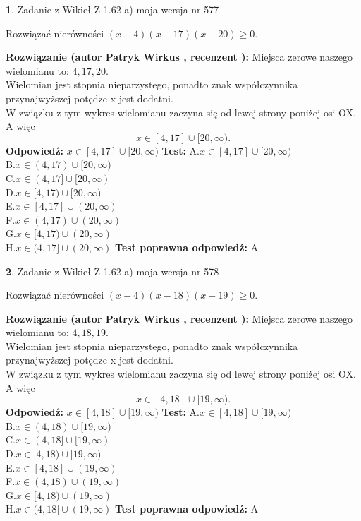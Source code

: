 \documentclass[12pt, a4paper]{article}
\theoremstyle{definition} %
\newtheorem{zad}{}
\newcommand{\zadStart}[1]{\begin{zad}#1\newline}
\newcommand{\zadStop}{\end{zad}}
\newcommand{\rozwStart}[2]{\noindent \textbf{Rozwiązanie (autor #1 , recenzent #2): }\newline}
\newcommand{\rozwStop}{\newline}
\newcommand{\odpStart}{\noindent \textbf{Odpowiedź:}\newline}
\newcommand{\odpStop}{\newline}
\newcommand{\testStart}{\noindent \textbf{Test:}\newline}
\newcommand{\testStop}{\newline}
\newcommand{\kluczStart}{\noindent \textbf{Test poprawna odpowiedź:}\newline}
\newcommand{\kluczStop}{\newline}
\begin{document}
\zadStart{Zadanie z Wikieł Z 1.62 a) moja wersja nr 577}

Rozwiązać nierówności $(x-4)(x-17)(x-20)\ge0$.
\zadStop
\rozwStart{Patryk Wirkus}{}
Miejsca zerowe naszego wielomianu to: $4, 17, 20$.\\
Wielomian jest stopnia nieparzystego, ponadto znak współczynnika przy\linebreak najwyższej potędze x jest dodatni.\\ W związku z tym wykres wielomianu zaczyna się od lewej strony poniżej osi OX. A więc $$x \in [4,17] \cup [20,\infty).$$
\rozwStop
\odpStart
$x \in [4,17] \cup [20,\infty)$
\odpStop
\testStart
A.$x \in [4,17] \cup [20,\infty)$\\
B.$x \in (4,17) \cup [20,\infty)$\\
C.$x \in (4,17] \cup [20,\infty)$\\
D.$x \in [4,17) \cup [20,\infty)$\\
E.$x \in [4,17] \cup (20,\infty)$\\
F.$x \in (4,17) \cup (20,\infty)$\\
G.$x \in [4,17) \cup (20,\infty)$\\
H.$x \in (4,17] \cup (20,\infty)$
\testStop
\kluczStart
A
\kluczStop



\zadStart{Zadanie z Wikieł Z 1.62 a) moja wersja nr 578}

Rozwiązać nierówności $(x-4)(x-18)(x-19)\ge0$.
\zadStop
\rozwStart{Patryk Wirkus}{}
Miejsca zerowe naszego wielomianu to: $4, 18, 19$.\\
Wielomian jest stopnia nieparzystego, ponadto znak współczynnika przy\linebreak najwyższej potędze x jest dodatni.\\ W związku z tym wykres wielomianu zaczyna się od lewej strony poniżej osi OX. A więc $$x \in [4,18] \cup [19,\infty).$$
\rozwStop
\odpStart
$x \in [4,18] \cup [19,\infty)$
\odpStop
\testStart
A.$x \in [4,18] \cup [19,\infty)$\\
B.$x \in (4,18) \cup [19,\infty)$\\
C.$x \in (4,18] \cup [19,\infty)$\\
D.$x \in [4,18) \cup [19,\infty)$\\
E.$x \in [4,18] \cup (19,\infty)$\\
F.$x \in (4,18) \cup (19,\infty)$\\
G.$x \in [4,18) \cup (19,\infty)$\\
H.$x \in (4,18] \cup (19,\infty)$
\testStop
\kluczStart
A
\kluczStop
\end{document}

